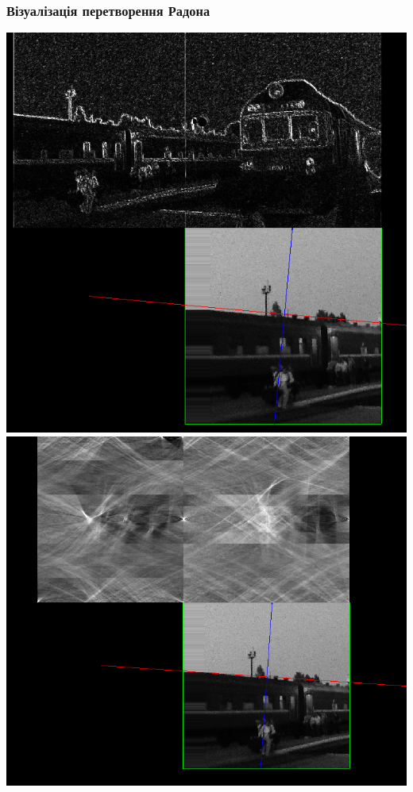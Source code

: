 \documentclass[12pt]{beamer}
\begin{document}
\begin{frame}\frametitle{ Візуалізація перетворення Радона }
	\begin{multicols}{2}
		\includegraphics[scale=0.19]{images/radon_fa} 
		\columnbreak	
		\includegraphics[scale=0.185]{images/radon_fa_2}
	\end{multicols}
	
\end{frame}
\end{document}
